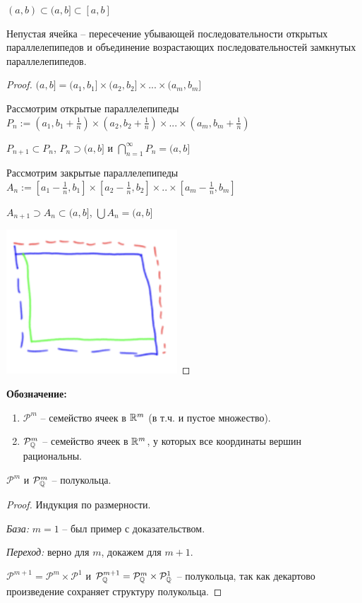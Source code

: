 \begin{remark}
    $(a, b)\subset (a, b]\subset [a, b]$
\end{remark}

\begin{statement}
    Непустая ячейка – пересечение убывающей последовательности открытых параллелепипедов
    и объединение возрастающих последовательностей замкнутых параллелепипедов.
\end{statement}

\begin{proof}
    $(a, b] = (a_1, b_1] \times (a_2, b_2] \times ... \times (a_m, b_m]$

    Рассмотрим открытые параллелепипеды $P_n:=(a_1, b_1 +\frac{1}{n})\times (a_2, b_2 +\frac{1}{n})\times ...\times (a_m, b_m +\frac{1}{n})$

    $P_{n+1}\subset P_n$, $P_n\supset (a, b]$ и $\bigcap\limits_{n=1}^\infty P_n=(a, b]$

    Рассмотрим закрытые параллелепипеды $A_n := [a_1 - \frac{1}{n}, b_1] \times [a_2 - \frac{1}{n}, b_2] \times .. \times [a_m - \frac{1}{n}, b_m]$

    $A_{n+1} \supset A_n \subset (a, b]$, $\bigcup A_n = (a, b]$

    \includegraphics[width=0.18\linewidth]{images/23-09-07-7.png}
\end{proof}

\textbf{Обозначение:} 
\begin{enumerate}
    \item $\mathcal{P}^m$ – семейство ячеек в $\mathbb{R}^m$ (в т.ч. и пустое множество).
    \item $\mathcal{P}_{\mathbb{Q}}^m$ – семейство ячеек в $\mathbb{R}^m$, у которых все координаты вершин рациональны.
\end{enumerate}

\begin{remark}
    $\mathcal{P}^m$ и $\mathcal{P}_{\mathbb{Q}}^m$ – полукольца.
\end{remark}

\begin{proof}
    Индукция по размерности.

    \textit{База:} $m=1$ – был пример с доказательством. 
    
    \textit{Переход:} верно для $m$, докажем для $m+1$. 

    $\mathcal{P}^{m+1}=\mathcal{P}^{m}\times \mathcal{P}^1$ и $\mathcal{P}_{\mathbb{Q}}^{m+1}=\mathcal{P}_{\mathbb{Q}}^{m}\times \mathcal{P}_{\mathbb{Q}}^1$ – 
    полукольца, так как декартово произведение сохраняет структуру полукольца.

\end{proof}

